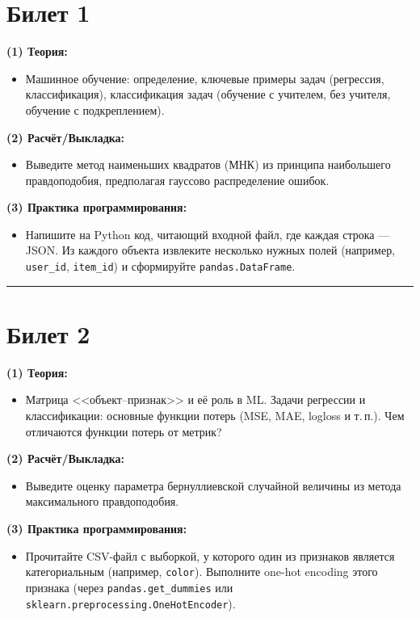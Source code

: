 \documentclass[a4paper,12pt]{article}
\begin{document}
\section*{Билет 1}
\textbf{(1) Теория:}
\begin{itemize}
  \item Машинное обучение: определение, ключевые примеры задач (регрессия, классификация), классификация задач (обучение с учителем, без учителя, обучение с подкреплением).
\end{itemize}

\textbf{(2) Расчёт/Выкладка:}
\begin{itemize}
  \item Выведите метод наименьших квадратов (МНК) из принципа наибольшего правдоподобия, предполагая гауссово распределение ошибок.
\end{itemize}

\textbf{(3) Практика программирования:}
\begin{itemize}
  \item Напишите на Python код, читающий входной файл, где каждая строка --- JSON. Из каждого объекта извлеките несколько нужных полей (например, \texttt{user\_id}, \texttt{item\_id}) и сформируйте \texttt{pandas.DataFrame}.
\end{itemize}

\noindent\rule{\textwidth}{0.4pt}

\section*{Билет 2}
\textbf{(1) Теория:}
\begin{itemize}
  \item Матрица <<объект--признак>> и её роль в ML. Задачи регрессии и классификации: основные функции потерь (MSE, MAE, logloss и т.\,п.). Чем отличаются функции потерь от метрик?
\end{itemize}

\textbf{(2) Расчёт/Выкладка:}
\begin{itemize}
  \item Выведите оценку параметра бернуллиевской случайной величины из метода максимального правдоподобия.
\end{itemize}

\textbf{(3) Практика программирования:}
\begin{itemize}
  \item Прочитайте CSV-файл с выборкой, у которого один из признаков является категориальным (например, \texttt{color}). Выполните one-hot encoding этого признака (через \texttt{pandas.get\_dummies} или \texttt{sklearn.preprocessing.OneHotEncoder}).
\end{itemize}
\end{document}

